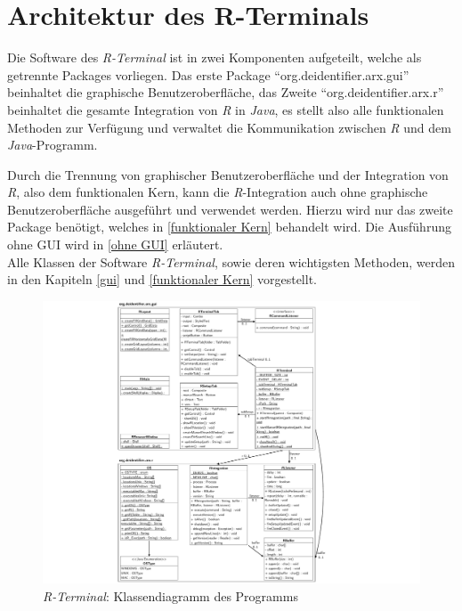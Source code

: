 \documentclass[a4paper, 12pt]{report} %
\begin{document}
\section{Architektur des R-Terminals}

Die Software des \textit{R-Terminal} ist in zwei Komponenten aufgeteilt, welche als getrennte Packages vorliegen. Das erste Package "`org.deidentifier.arx.gui"' beinhaltet die graphische Benutzeroberfläche, das Zweite "`org.deidentifier.arx.r"' beinhaltet die gesamte Integration von \textit{R} in \textit{Java}, es stellt also alle funktionalen Methoden zur Verfügung und verwaltet die Kommunikation zwischen \textit{R} und dem \textit{Java}-Programm.

Durch die Trennung von graphischer Benutzeroberfläche und der Integration von \textit{R}, also dem funktionalen Kern, kann die \textit{R}-Integration auch ohne graphische Benutzeroberfläche ausgeführt und verwendet werden. Hierzu wird nur das zweite Package benötigt, welches in \ref{funktionaler Kern} behandelt wird. Die Ausführung ohne GUI wird in \ref{ohne GUI} erläutert.\\

Alle Klassen der Software \textit{R-Terminal}, sowie deren wichtigsten Methoden, werden in den Kapiteln \ref{gui} und \ref{funktionaler Kern} vorgestellt.

\begin{figure}[h!]
		\includegraphics[width = 15cm]{Bilder/Klassendiagramm.pdf}
    	\caption{\textit{R-Terminal}: Klassendiagramm des Programms}
    	\label{klassendiagramm}
\end{figure}
\FloatBarrier
\newpage
\end{document}
